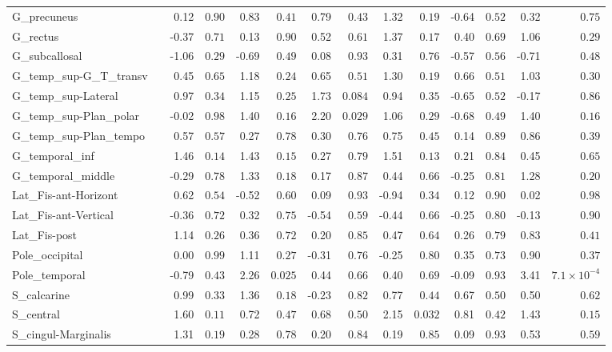 {\begin{longtable}{llrrrrrrrrrrrr}
G\_precuneus &  & 0.12 & $0.90$ & 0.83 & $0.41$ & 0.79 & $0.43$ & 1.32 & $0.19$ & -0.64 & $0.52$ & 0.32 & $0.75$ \\
G\_rectus &  & -0.37 & $0.71$ & 0.13 & $0.90$ & 0.52 & $0.61$ & 1.37 & $0.17$ & 0.40 & $0.69$ & 1.06 & $0.29$ \\
G\_subcallosal &  & -1.06 & $0.29$ & -0.69 & $0.49$ & 0.08 & $0.93$ & 0.31 & $0.76$ & -0.57 & $0.56$ & -0.71 & $0.48$ \\
G\_temp\_sup-G\_T\_transv &  & 0.45 & $0.65$ & 1.18 & $0.24$ & 0.65 & $0.51$ & 1.30 & $0.19$ & 0.66 & $0.51$ & 1.03 & $0.30$ \\
G\_temp\_sup-Lateral &  & 0.97 & $0.34$ & 1.15 & $0.25$ & 1.73 & $0.084$ & 0.94 & $0.35$ & -0.65 & $0.52$ & -0.17 & $0.86$ \\
G\_temp\_sup-Plan\_polar &  & -0.02 & $0.98$ & 1.40 & $0.16$ & 2.20 & $0.029$ & 1.06 & $0.29$ & -0.68 & $0.49$ & 1.40 & $0.16$ \\
G\_temp\_sup-Plan\_tempo &  & 0.57 & $0.57$ & 0.27 & $0.78$ & 0.30 & $0.76$ & 0.75 & $0.45$ & 0.14 & $0.89$ & 0.86 & $0.39$ \\
G\_temporal\_inf &  & 1.46 & $0.14$ & 1.43 & $0.15$ & 0.27 & $0.79$ & 1.51 & $0.13$ & 0.21 & $0.84$ & 0.45 & $0.65$ \\
G\_temporal\_middle &  & -0.29 & $0.78$ & 1.33 & $0.18$ & 0.17 & $0.87$ & 0.44 & $0.66$ & -0.25 & $0.81$ & 1.28 & $0.20$ \\
Lat\_Fis-ant-Horizont &  & 0.62 & $0.54$ & -0.52 & $0.60$ & 0.09 & $0.93$ & -0.94 & $0.34$ & 0.12 & $0.90$ & 0.02 & $0.98$ \\
Lat\_Fis-ant-Vertical &  & -0.36 & $0.72$ & 0.32 & $0.75$ & -0.54 & $0.59$ & -0.44 & $0.66$ & -0.25 & $0.80$ & -0.13 & $0.90$ \\
Lat\_Fis-post &  & 1.14 & $0.26$ & 0.36 & $0.72$ & 0.20 & $0.85$ & 0.47 & $0.64$ & 0.26 & $0.79$ & 0.83 & $0.41$ \\
Pole\_occipital &  & 0.00 & $0.99$ & 1.11 & $0.27$ & -0.31 & $0.76$ & -0.25 & $0.80$ & 0.35 & $0.73$ & 0.90 & $0.37$ \\
Pole\_temporal &  & -0.79 & $0.43$ & 2.26 & $0.025$ & 0.44 & $0.66$ & 0.40 & $0.69$ & -0.09 & $0.93$ & 3.41 & $7.1{\times}10^{-4}$ \\
S\_calcarine &  & 0.99 & $0.33$ & 1.36 & $0.18$ & -0.23 & $0.82$ & 0.77 & $0.44$ & 0.67 & $0.50$ & 0.50 & $0.62$ \\
S\_central &  & 1.60 & $0.11$ & 0.72 & $0.47$ & 0.68 & $0.50$ & 2.15 & $0.032$ & 0.81 & $0.42$ & 1.43 & $0.15$ \\
S\_cingul-Marginalis &  & 1.31 & $0.19$ & 0.28 & $0.78$ & 0.20 & $0.84$ & 0.19 & $0.85$ & 0.09 & $0.93$ & 0.53 & $0.59$ \\

\end{longtable}}
